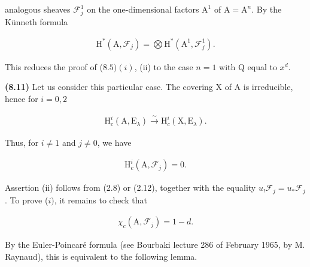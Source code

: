 \documentclass[10pt,leqno]{article}
\begin{document}
\noindent analogous sheaves \(\mathcal{F} _{j}^{1}\) on the one-dimensional factors \(\mathrm{A}^{1}\) of \(\mathrm{A} = \mathrm{A}^{n}\). By the Künneth formula\par

\begin{equation*}\begin{gathered}\mathrm{H}^{*}(\mathrm{A},\mathcal{F} _{j}) = \bigotimes \mathrm{H}^{*}(\mathrm{A}^{1},\mathcal{F} _{j}^{1}).\end{gathered}\end{equation*}

\noindent This reduces the proof of (\(8.5) (i)\), (ii) to the case \(n = 1\) with \(\mathrm{Q}\) equal to \(x^{d}\).\par

\noindent \textbf{(8.11)} Let us consider this particular case. The covering \(\mathrm{X}\) of \(\mathrm{A}\) is irreducible, hence for \(i = 0,2\)\par

\begin{equation*}\begin{gathered}\mathrm{H}_{c}^{i}(\mathrm{A},\mathrm{E}_{\lambda }) \xrightarrow{\sim } \mathrm{H}_{c}^{i}(\mathrm{X},\mathrm{E}_{\lambda }).\end{gathered}\end{equation*}

\noindent Thus, for \(i \ne  1\) and \(j \ne  0\), we have\par

\begin{equation*}\begin{gathered}\mathrm{H}_{c}^{i}(\mathrm{A},\mathcal{F} _{j}) = 0.\end{gathered}\end{equation*}

\noindent Assertion (ii) follows from (2.8) or (2.12), together with the equality \(u_{!}\mathcal{F} _{j} = u_{*}\mathcal{F} _{j}\). To prove (\(i)\), it remains to check that\par

\begin{equation*}\begin{gathered}\chi _{c}(\mathrm{A},\mathcal{F} _{j}) = 1-d.\end{gathered}\end{equation*}

\noindent By the Euler-Poincaré formula (see Bourbaki lecture 286 of February 1965, by \(\mathrm{M}\). Raynaud), this is equivalent to the following lemma.\par
\end{document}
